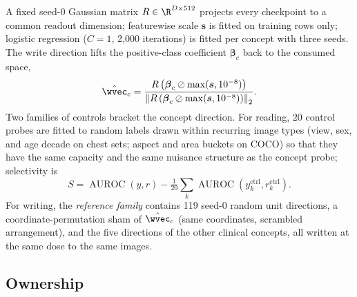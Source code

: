 A fixed seed-0 Gaussian matrix $R\in\R^{D\times512}$ projects every checkpoint to a common readout dimension; featurewise scale $\boldsymbol s$ is fitted on training rows only; logistic regression ($C=1$, 2{,}000 iterations) is fitted per concept with three seeds. The write direction lifts the positive-class coefficient $\boldsymbol\beta_c$ back to the consumed space,
\begin{equation}
\hat\wvec_c=\frac{R\left(\boldsymbol\beta_c\oslash\max(\boldsymbol s,10^{-8})\right)}{\left\lVert R\left(\boldsymbol\beta_c\oslash\max(\boldsymbol s,10^{-8})\right)\right\rVert_2}.
\label{eq:lift}
\end{equation}
Two families of controls bracket the concept direction. For reading, 20 control probes are fitted to random labels drawn within recurring image types (view, sex, and age decade on chest sets; aspect and area buckets on COCO) so that they have the same capacity and the same nuisance structure as the concept probe; selectivity is
\begin{equation}
S=\operatorname{AUROC}(y,r)-\tfrac{1}{20}\textstyle\sum_{k}\operatorname{AUROC}(y^{\mathrm{ctrl}}_k,r^{\mathrm{ctrl}}_k).
\label{eq:selectivity}
\end{equation}
For writing, the \emph{reference family} contains 119 seed-0 random unit directions, a coordinate-permutation sham of $\hat\wvec_c$ (same coordinates, scrambled arrangement), and the five directions of the other clinical concepts, all written at the same dose to the same images.

\subsection{Ownership}
\label{sec:ownership}

